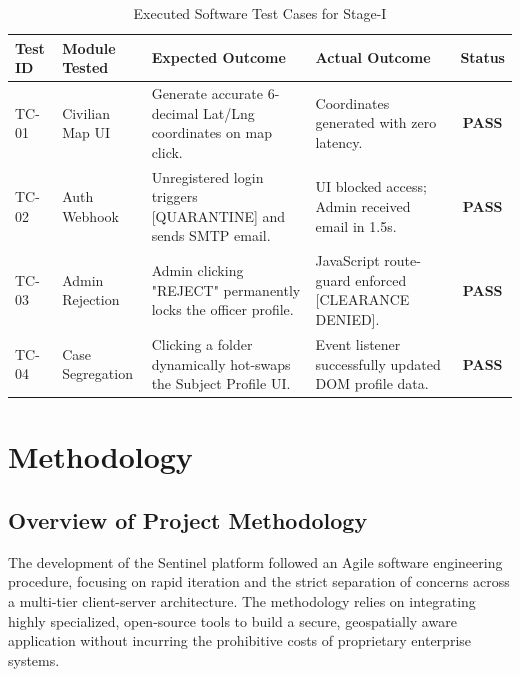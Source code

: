 \documentclass[12pt,a4paper]{report}
\begin{document}
\begin{table}[H]
\centering
\begin{tabular}{|p{1.5cm}|p{3.5cm}|p{4.5cm}|p{4.5cm}|c|}
\hline
\textbf{Test ID} & \textbf{Module Tested} & \textbf{Expected Outcome} & \textbf{Actual Outcome} & \textbf{Status} \\ \hline
TC-01 & Civilian Map UI & Generate accurate 6-decimal Lat/Lng coordinates on map click. & Coordinates generated with zero latency. & \textbf{PASS} \\ \hline
TC-02 & Auth Webhook & Unregistered login triggers [QUARANTINE] and sends SMTP email. & UI blocked access; Admin received email in 1.5s. & \textbf{PASS} \\ \hline
TC-03 & Admin Rejection & Admin clicking "REJECT" permanently locks the officer profile. & JavaScript route-guard enforced [CLEARANCE DENIED]. & \textbf{PASS} \\ \hline
TC-04 & Case Segregation & Clicking a folder dynamically hot-swaps the Subject Profile UI. & Event listener successfully updated DOM profile data. & \textbf{PASS} \\ \hline
\end{tabular}
\caption{Executed Software Test Cases for Stage-I}
\end{table}


\chapter{Methodology}

\section{Overview of Project Methodology}
The development of the Sentinel platform followed an Agile software engineering procedure, focusing on rapid iteration and the strict separation of concerns across a multi-tier client-server architecture. The methodology relies on integrating highly specialized, open-source tools to build a secure, geospatially aware application without incurring the prohibitive costs of proprietary enterprise systems.
\end{document}
